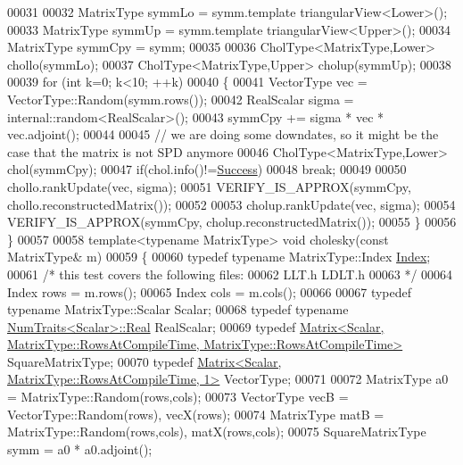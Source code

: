 \begin{DoxyCode}
00031 
00032   MatrixType symmLo = symm.template triangularView<Lower>();
00033   MatrixType symmUp = symm.template triangularView<Upper>();
00034   MatrixType symmCpy = symm;
00035 
00036   CholType<MatrixType,Lower> chollo(symmLo);
00037   CholType<MatrixType,Upper> cholup(symmUp);
00038 
00039   \textcolor{keywordflow}{for} (\textcolor{keywordtype}{int} k=0; k<10; ++k)
00040   \{
00041     VectorType vec = VectorType::Random(symm.rows());
00042     RealScalar sigma = internal::random<RealScalar>();
00043     symmCpy += sigma * vec * vec.adjoint();
00044 
00045     \textcolor{comment}{// we are doing some downdates, so it might be the case that the matrix is not SPD anymore}
00046     CholType<MatrixType,Lower> chol(symmCpy);
00047     \textcolor{keywordflow}{if}(chol.info()!=\hyperlink{group__enums_gga85fad7b87587764e5cf6b513a9e0ee5ea52581b035f4b59c203b8ff999ef5fcea}{Success})
00048       \textcolor{keywordflow}{break};
00049 
00050     chollo.rankUpdate(vec, sigma);
00051     VERIFY\_IS\_APPROX(symmCpy, chollo.reconstructedMatrix());
00052 
00053     cholup.rankUpdate(vec, sigma);
00054     VERIFY\_IS\_APPROX(symmCpy, cholup.reconstructedMatrix());
00055   \}
00056 \}
00057 
00058 \textcolor{keyword}{template}<\textcolor{keyword}{typename} MatrixType> \textcolor{keywordtype}{void} cholesky(\textcolor{keyword}{const} MatrixType& m)
00059 \{
00060   \textcolor{keyword}{typedef} \textcolor{keyword}{typename} MatrixType::Index \hyperlink{namespace_eigen_a62e77e0933482dafde8fe197d9a2cfde}{Index};
00061   \textcolor{comment}{/* this test covers the following files:}
00062 \textcolor{comment}{     LLT.h LDLT.h}
00063 \textcolor{comment}{  */}
00064   Index rows = m.rows();
00065   Index cols = m.cols();
00066 
00067   \textcolor{keyword}{typedef} \textcolor{keyword}{typename} MatrixType::Scalar Scalar;
00068   \textcolor{keyword}{typedef} \textcolor{keyword}{typename} \hyperlink{group___core___module_struct_eigen_1_1_num_traits}{NumTraits<Scalar>::Real} RealScalar;
00069   \textcolor{keyword}{typedef} 
      \hyperlink{group___core___module_class_eigen_1_1_matrix}{Matrix<Scalar, MatrixType::RowsAtCompileTime, MatrixType::RowsAtCompileTime>}
       SquareMatrixType;
00070   \textcolor{keyword}{typedef} \hyperlink{group___core___module_class_eigen_1_1_matrix}{Matrix<Scalar, MatrixType::RowsAtCompileTime, 1>} 
      VectorType;
00071 
00072   MatrixType a0 = MatrixType::Random(rows,cols);
00073   VectorType vecB = VectorType::Random(rows), vecX(rows);
00074   MatrixType matB = MatrixType::Random(rows,cols), matX(rows,cols);
00075   SquareMatrixType symm =  a0 * a0.adjoint();

\end{DoxyCode}
